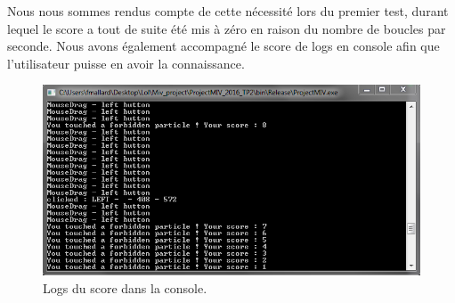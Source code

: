 \documentclass[a4paper,12pt]{article}
\begin{document}
Nous nous sommes rendus compte de cette nécessité lors du premier test, durant lequel le score a tout de suite été mis à zéro en raison du nombre de boucles par seconde.
Nous avons également accompagné le score de logs en console afin que l'utilisateur puisse en avoir la connaissance.
\begin{figure}[ht!]
  \centering
  \includegraphics[width=\textwidth]{images/score_console.png}
  \caption{Logs du score dans la console.}
  \label{fig:score_console}
\end{figure}
\end{document}
